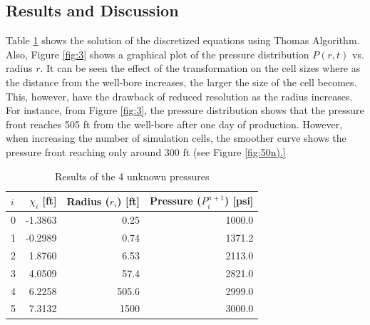 \documentclass[12pt,letterpaper,titlepage]{article}
\begin{document}
\subsection{Results and Discussion}
Table \ref{tab:1} shows the solution of the discretized equations using Thomas Algorithm. Also, Figure \ref{fig:3} shows a graphical plot of the pressure distribution $P(r,t)$ vs. radius $r$. It can be seen the effect of the transformation on the cell sizes where as the distance from the well-bore increases, the larger the size of the cell becomes. This, however, have the drawback of reduced resolution as the radius increases. For instance, from Figure \ref{fig:3}, the pressure distribution shows that the pressure front reaches 505 ft from the well-bore after one day of production. However, when increasing the number of simulation cells, the smoother curve shows the pressure front reaching only around 300 ft (see Figure \ref{fig:50n).}
\begin{table}[h]
\centering
\begin{tabular}{lrrr}
$i$  & $\chi_i$ [ft]& Radius ($r_i$) [ft] & Pressure ($P_i^{n+1}$) [psi] \\\hline
0 &-1.3863 & 0.25 & 1000.0\\
1& -0.2989 & 0.74 & 1371.2\\
2& 1.8760 & 6.53 & 2113.0\\
3 &4.0509 & 57.4 & 2821.0\\
4& 6.2258 & 505.6 & 2999.0\\
5& 7.3132 & 1500 & 3000.0\\
\hline
\end{tabular}
\caption{\label{tab:1}Results of the 4 unknown pressures}
\end{table}
\pagebreak
\end{document}
